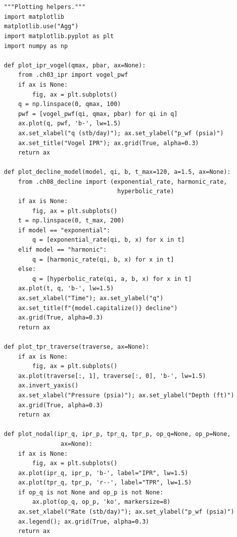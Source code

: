 \documentclass[10pt,a4paper,openany]{book}
\begin{document}
\chapter{}
\begin{lstlisting}
"""Plotting helpers."""
import matplotlib
matplotlib.use("Agg")
import matplotlib.pyplot as plt
import numpy as np

def plot_ipr_vogel(qmax, pbar, ax=None):
    from .ch03_ipr import vogel_pwf
    if ax is None:
        fig, ax = plt.subplots()
    q = np.linspace(0, qmax, 100)
    pwf = [vogel_pwf(qi, qmax, pbar) for qi in q]
    ax.plot(q, pwf, 'b-', lw=1.5)
    ax.set_xlabel("q (stb/day)"); ax.set_ylabel("p_wf (psia)")
    ax.set_title("Vogel IPR"); ax.grid(True, alpha=0.3)
    return ax

def plot_decline_model(model, qi, b, t_max=120, a=1.5, ax=None):
    from .ch08_decline import (exponential_rate, harmonic_rate,
                                hyperbolic_rate)
    if ax is None:
        fig, ax = plt.subplots()
    t = np.linspace(0, t_max, 200)
    if model == "exponential":
        q = [exponential_rate(qi, b, x) for x in t]
    elif model == "harmonic":
        q = [harmonic_rate(qi, b, x) for x in t]
    else:
        q = [hyperbolic_rate(qi, a, b, x) for x in t]
    ax.plot(t, q, 'b-', lw=1.5)
    ax.set_xlabel("Time"); ax.set_ylabel("q")
    ax.set_title(f"{model.capitalize()} decline")
    ax.grid(True, alpha=0.3)
    return ax

def plot_tpr_traverse(traverse, ax=None):
    if ax is None:
        fig, ax = plt.subplots()
    ax.plot(traverse[:, 1], traverse[:, 0], 'b-', lw=1.5)
    ax.invert_yaxis()
    ax.set_xlabel("Pressure (psia)"); ax.set_ylabel("Depth (ft)")
    ax.grid(True, alpha=0.3)
    return ax

def plot_nodal(ipr_q, ipr_p, tpr_q, tpr_p, op_q=None, op_p=None,
                ax=None):
    if ax is None:
        fig, ax = plt.subplots()
    ax.plot(ipr_q, ipr_p, 'b-', label="IPR", lw=1.5)
    ax.plot(tpr_q, tpr_p, 'r--', label="TPR", lw=1.5)
    if op_q is not None and op_p is not None:
        ax.plot(op_q, op_p, 'ko', markersize=8)
    ax.set_xlabel("Rate (stb/day)"); ax.set_ylabel("p_wf (psia)")
    ax.legend(); ax.grid(True, alpha=0.3)
    return ax
\end{lstlisting}
\end{document}
